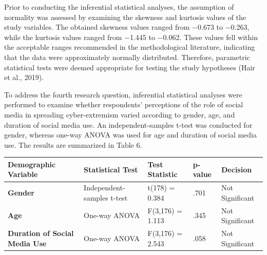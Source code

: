 \documentclass[10pt]{NSP1}
\makeatletter
\newcommand\jltx@wideopen{\par\addvspace{\medskipamount}\noindent}
\newcommand\jltx@wideclose{\par\addvspace{\medskipamount}}
\newenvironment{jltxspan}
  {\if@twocolumn\let\jltx@spannext\strip\else\let\jltx@spannext\jltx@wideopen\fi\jltx@spannext}
  {\if@twocolumn\let\jltx@spanend\endstrip\else\let\jltx@spanend\jltx@wideclose\fi\jltx@spanend}
\newcommand\JLTXaboveplacement{\par\addvspace{6pt plus 2pt minus 2pt}\noindent}
\newcommand\JLTXbelowplacement{\par\addvspace{6pt plus 2pt minus 2pt}}
\makeatother
\begin{document}
Prior to conducting the inferential statistical analyses, the assumption of normality was assessed by examining the skewness and kurtosis values of the study variables. The obtained skewness values ranged from −0.673 to −0.263, while the kurtosis values ranged from −1.445 to −0.062. These values fell within the acceptable ranges recommended in the methodological literature, indicating that the data were approximately normally distributed. Therefore, parametric statistical tests were deemed appropriate for testing the study hypotheses (Hair et al., 2019).

\par\vspace{5.0pt}\vspace{5.0pt}

To address the fourth research question, inferential statistical analyses were performed to examine whether respondents' perceptions of the role of social media in spreading cyber-extremism varied according to gender, age, and duration of social media use. An independent-samples t-test was conducted for gender, whereas one-way ANOVA was used for age and duration of social media use. The results are summarized in Table 6.

\JLTXaboveplacement \begin{jltxspan}%
\noindent\begin{minipage}{\linewidth}%
\centering
{\small
\begin{tabular}{|>{\centering\arraybackslash}p{}|>{\centering\arraybackslash}p{}|>{\centering\arraybackslash}p{}|>{\raggedright\arraybackslash}p{}|>{\centering\arraybackslash}p{}|}
\hline
\cellcolor[HTML]{DDD9C3}\textbf{Demographic Variable} & \cellcolor[HTML]{DDD9C3}\textbf{Statistical Test} & \cellcolor[HTML]{DDD9C3}\textbf{Test Statistic} & \cellcolor[HTML]{DDD9C3}\textbf{p-value} & \cellcolor[HTML]{DDD9C3}\textbf{Decision} \\
\hline
\cellcolor[HTML]{DDD9C3}\textbf{Gender} & Independent-samples t-test & t(178) = 0.384 & .701 & Not Significant \\
\hline
\cellcolor[HTML]{DDD9C3}\textbf{Age} & One-way ANOVA & F(3,176) = 1.113 & .345 & Not Significant \\
\hline
\cellcolor[HTML]{DDD9C3}\textbf{Duration of Social Media Use} & One-way ANOVA & F(3,176) = 2.543 & .058 & Not Significant \\
\hline
\end{tabular}}
%
\end{minipage}%
\end{jltxspan}\JLTXbelowplacement 
\end{document}
